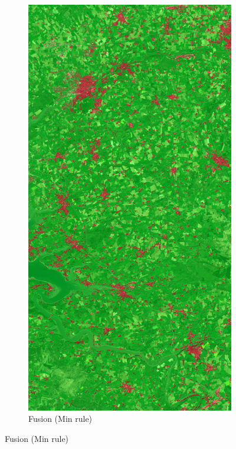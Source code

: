 \documentclass[10pt]{article}
\begin{document}
\begin{appendices}
\begin{figure}[H]
    \centering 
    \begin{subfigure}{0.49\textwidth}
        \centering
        \includegraphics[width=\textwidth]{all_classif_Fusion_Min_overlay}
        \caption{Fusion (Min rule)}

\end{subfigure}
\end{figure}
\end{appendices}
\end{document}
